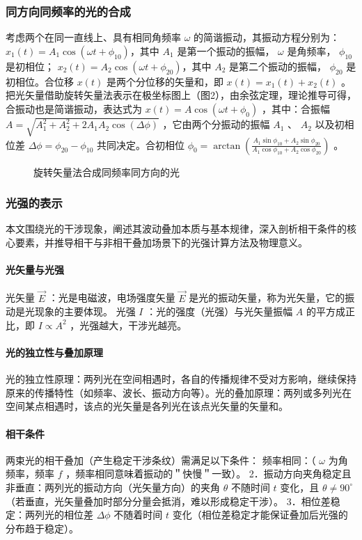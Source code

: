 \documentclass{ctexart}
\begin{document}
\subsubsection{同方向同频率的光的合成}
考虑两个在同一直线上、具有相同角频率 $\omega$ 的简谐振动，其振动方程分别为：
$x_1(t) = A_1 \cos(\omega t + \phi_{10})$，其中 $A_1$ 是第一个振动的振幅， $\omega$ 是角频率， $\phi_{10}$ 是初相位；
$x_2(t) = A_2 \cos(\omega t + \phi_{20})$，其中 $A_2$ 是第二个振动的振幅， $\phi_{20}$ 是初相位。合位移 $x(t)$ 是两个分位移的矢量和，即 $x(t) = x_1(t) + x_2(t)$ 。
把光矢量借助旋转矢量法表示在极坐标图上（图2），由余弦定理，理论推导可得，合振动也是简谐振动，表达式为 $x(t) = A \cos(\omega t + \phi_0)$ ，其中：合振幅 $A = \sqrt{A_1^2 + A_2^2 + 2 A_1 A_2 \cos(\Delta \phi)}$ ，它由两个分振动的振幅 $A_1$ 、 $A_2$ 以及初相位差 $\Delta \phi = \phi_{20} - \phi_{10}$ 共同决定。合初相位 $\phi_0 = \arctan \left( \frac{A_1 \sin \phi_{10} + A_2 \sin \phi_{20}}{A_1 \cos \phi_{10} + A_2 \cos \phi_{20}} \right)$ 。

\begin{figure}[ht]
    \centering
    \fbox{\rule{2cm}{0pt} \rule{0pt}{2cm}} %
    \caption{旋转矢量法合成同频率同方向的光}
    \label{fig:2}
\end{figure}

\subsubsection{光强的表示}
本文围绕光的干涉现象，阐述其波动叠加本质与基本规律，深入剖析相干条件的核心要素，并推导相干与非相干叠加场景下的光强计算方法及物理意义。

\paragraph{光矢量与光强}
光矢量 $\vec{E}$ ：光是电磁波，电场强度矢量 $\vec{E}$ 是光的振动矢量，称为光矢量，它的振动是光现象的主要体现。
光强 $I$ ：光的强度（光强）与光矢量振幅 $A$ 的平方成正比，即 $I \propto A^2$ ，光强越大，干涉光越亮。

\paragraph{光的独立性与叠加原理}
光的独立性原理：两列光在空间相遇时，各自的传播规律不受对方影响，继续保持原来的传播特性（如频率、波长、振动方向等）。光的叠加原理：两列或多列光在空间某点相遇时，该点的光矢量是各列光在该点光矢量的矢量和。

\paragraph{相干条件}
两束光的相干叠加（产生稳定干涉条纹）需满足以下条件：
频率相同：（ $\omega$ 为角频率，频率 $f$ ，频率相同意味着振动的＂快慢＂一致）。
2．振动方向夹角稳定且非垂直：两列光的振动方向（光矢量方向）的夹角 $\theta$ 不随时间 $t$ 变化，且 $\theta \neq 90^\circ$ （若垂直，光矢量叠加时部分分量会抵消，难以形成稳定干涉）。
3．相位差稳定：两列光的相位差 $\Delta \phi$ 不随着时间 $t$ 变化（相位差稳定才能保证叠加后光强的分布趋于稳定）。
\end{document}
